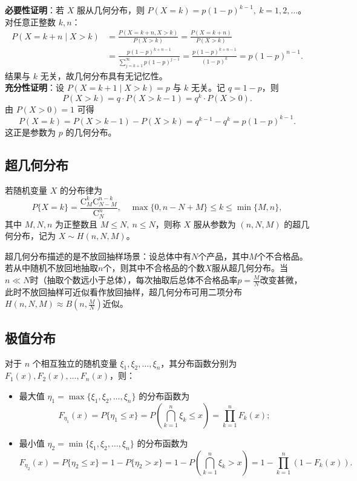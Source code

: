 \documentclass[lang=cn,11pt]{elegantbook}
\begin{document}
\begin{solution}
\textbf{必要性证明}：若 $X$ 服从几何分布，则 $P(X=k)=p(1-p)^{k-1},\ k=1,2,\dots$。对任意正整数 $k,n$：
\[
\begin{aligned}
P(X=k+n\mid X>k) &= \frac{P(X=k+n, X>k)}{P(X>k)} = \frac{P(X=k+n)}{P(X>k)} \\
&= \frac{p(1-p)^{k+n-1}}{\sum_{j=k+1}^{\infty}p(1-p)^{j-1}} = \frac{p(1-p)^{k+n-1}}{(1-p)^k} = p(1-p)^{n-1}.
\end{aligned}
\]
结果与 $k$ 无关，故几何分布具有无记忆性。\\
\textbf{充分性证明}：设 $P(X=k+1\mid X>k)=p$ 与 $k$ 无关。记 $q=1-p$，则
\[
P(X>k) = q\cdot P(X>k-1) = q^k\cdot P(X>0).
\]
由 $P(X>0)=1$ 可得
\[
P(X=k) = P(X>k-1) - P(X>k) = q^{k-1} - q^k = p(1-p)^{k-1}.
\]
这正是参数为 $p$ 的几何分布。
\end{solution}



\subsection{超几何分布} \label{subsec:hypergeo-dist}
\begin{definition}[超几何分布] \label{def:hypergeo-dist}
若随机变量 $X$ 的分布律为
\[
P\{X=k\} = \frac{\mathrm{C}_M^k \mathrm{C}_{N-M}^{n-k}}{\mathrm{C}_N^n},\quad \max\{0,n-N+M\} \le k \le \min\{M,n\},
\]
其中 $M,N,n$ 为正整数且 $M \le N,\ n \le N$，则称 $X$ 服从参数为 $(n,N,M)$ 的超几何分布，记为 $X \sim H(n,N,M)$。
\end{definition}

\begin{note}
超几何分布描述的是不放回抽样场景：设总体中有$N$个产品，其中$M$个不合格品。若从中随机不放回地抽取$n$个，则其中不合格品的个数$X$服从超几何分布。当$n \ll N$时（抽取个数远小于总体），每次抽取后总体不合格品率$p=\frac{M}{N}$改变甚微，此时不放回抽样可近似看作放回抽样，超几何分布可用二项分布$H(n,N,M) \approx B(n,\frac{M}{N})$近似。
\end{note}

\subsection{极值分布} \label{subsec:extreme-dist}
\begin{property}\label{prop:extreme-value}
对于 $n$ 个相互独立的随机变量 $\xi_1,\xi_2,\dots,\xi_n$，其分布函数分别为 $F_1(x),F_2(x),\dots,F_n(x)$，则：
\begin{itemize}
    \item 最大值 $\eta_1 = \max\{\xi_1,\xi_2,\dots,\xi_n\}$ 的分布函数为
    \[
    F_{\eta_1}(x) = P\{\eta_1 \le x\} = P\left(\bigcap_{k=1}^n \xi_k \le x\right) = \prod_{k=1}^n F_k(x);
    \]
    \item 最小值 $\eta_2 = \min\{\xi_1,\xi_2,\dots,\xi_n\}$ 的分布函数为
    \[
    F_{\eta_2}(x) = P\{\eta_2 \le x\} = 1 - P\{\eta_2 > x\} = 1 - P\left(\bigcap_{k=1}^n \xi_k > x\right) = 1 - \prod_{k=1}^n (1-F_k(x)).
    \]
\end{itemize}
\end{property}
\end{document}
